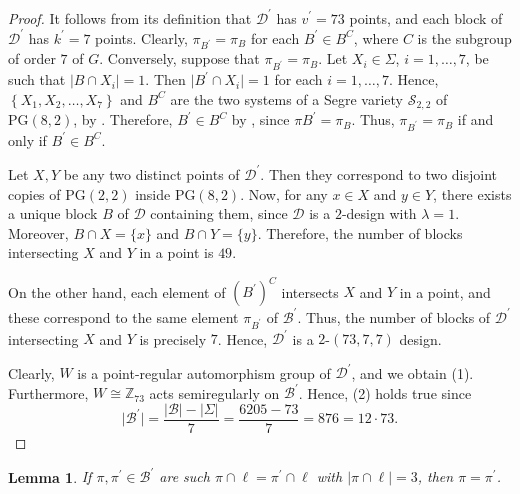 \documentclass[a4paper, 11pt]{article}
\newtheorem{lemma}[theorem]{Lemma}
\theoremstyle{definition}
\theoremstyle{definition}
\theoremstyle{definition}
\numberwithin{equation}{section}
\begin{document}
\begin{proof}
	It follows from its definition that $\mathcal{D}^\prime$ has $v^\prime = 73$ points, and each block of $\mathcal{D}^\prime$ has $k^\prime = 7$ points. Clearly, $\pi_{B^\prime} = \pi_{B}$ for each $B^\prime \in B^{C}$, where $C$ is the subgroup of order $7$ of $G$. Conversely, suppose that $\pi_{B^\prime} = \pi_{B}$. Let $X_i \in \Sigma$, $i = 1, \ldots, 7$, be such that $\lvert B \cap X_i \rvert = 1$. Then $\lvert B^\prime \cap X_i \rvert = 1$ for each $i = 1, \ldots, 7$. Hence, $\left\{X_1, X_2, \ldots, X_7\right\}$ and $B^{C}$ are the two systems of a Segre variety $\mathcal{S}_{2,2}$ of $\mathrm{PG}(8,2)$, by \cite[Section 25.5]{HT}. Therefore, $B^\prime \in B^{C}$ by \cite[Theorem 25.5.11]{HT}, since $\pi{B^\prime} = \pi_{B}$. Thus, $\pi_{B^\prime} = \pi_{B}$ if and only if $B^\prime \in B^{C}$.
	
	Let $X, Y$ be any two distinct points of $\mathcal{D}^\prime$. Then they correspond to two disjoint copies of $\mathrm{PG}(2,2)$ inside $\mathrm{PG}(8,2)$. Now, for any $x \in X$ and $y \in Y$, there exists a unique block $B$ of $\mathcal{D}$ containing them, since $\mathcal{D}$ is a $2$-design with $\lambda = 1$. Moreover, $B \cap X = \{x\}$ and $B \cap Y = \{y\}$. Therefore, the number of blocks intersecting $X$ and $Y$ in a point is $49$. 
	
	On the other hand, each element of $(B^\prime)^{C}$ intersects $X$ and $Y$ in a point, and these correspond to the same element $\pi_{B^\prime}$ of $\mathcal{B}^\prime$. Thus, the number of blocks of $\mathcal{D}^\prime$ intersecting $X$ and $Y$ is precisely $7$. Hence, $\mathcal{D}^\prime$ is a $2$-$(73,7,7)$ design.
	
	Clearly, $W$ is a point-regular automorphism group of $\mathcal{D}^\prime$, and we obtain (1). Furthermore, $W \cong \mathbb{Z}_{73}$ acts semiregularly on $\mathcal{B}^\prime$. Hence, (2) holds true since 
	\[
	\lvert \mathcal{B}^\prime \rvert = \frac{\lvert \mathcal{B} \rvert - \lvert \Sigma \rvert}{7}
	= \frac{6205 - 73}{7}
	= 876 = 12 \cdot 73.
	\]
\end{proof}

 

\begin{lemma}
	\label{digest}If $\pi ,\pi ^{\prime }\in \mathcal{B}^{\prime }$ are such $%
	\pi \cap \ell =\pi ^{\prime }\cap \ell $ with $\lvert \pi \cap \ell
	\rvert =3$, then $\pi =\pi ^{\prime }$.
\end{lemma}
\end{document}
